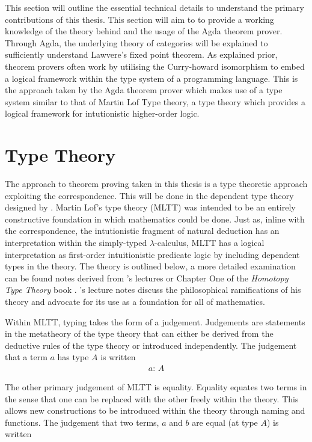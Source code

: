 This section will outline the essential technical details to understand the
primary contributions of this thesis. This section will aim to to provide a
working knowledge of the theory behind and the usage of the Agda theorem prover.
Through Agda, the underlying theory of categories will be explained to
sufficiently understand Lawvere's fixed point theorem. As explained prior,
theorem provers often work by utilising the Curry-howard isomorphism to embed a
logical framework within the type system of a programming language. This is the
approach taken by the Agda theorem prover which makes use of a type system
similar to that of Martin Lof Type theory, a type theory which provides a
logical framework for intutionistic higher-order logic.

\section{\mlt{} Type Theory}
The approach to theorem proving taken in this thesis is a type theoretic
approach exploiting the \cuho{} correspondence. This will be done in the
dependent type theory designed by \mlt{}. Martin Lof's type theory (MLTT) was intended to be an
entirely constructive foundation in which mathematics could be done. Just as,
inline with the \cuho{} correspondence, the intutionistic fragment of
natural deduction has an interpretation within the simply-typed
$\lambda$-calculus, MLTT has a logical interpretation as first-order
intuitionistic predicate logic by including dependent types in the theory. The
theory is outlined below, a more detailed examination can be found notes derived
from \mlt's lectures \cite{martin1984intuitionistic} or Chapter One of the
\textit{Homotopy Type Theory} book \cite{hottbook}. \mlt's lecture notes
discuss the philosophical ramifications of his theory and advocate for its use
as a foundation for all of mathematics.

Within MLTT, typing takes the form of a judgement. Judgements are statements in
the metatheory of the type theory that can either be derived from the deductive
rules of the type theory or introduced independently. The judgement that a term
$a$ has type $A$ is written
\begin{align*}
    a: \, A
\end{align*}

The other primary judgement of MLTT is equality. Equality equates
two terms in the sense that one can be replaced with the other freely within the
theory. This allows new constructions to be introduced within the theory through
naming and functions. The judgement that
two terms, $a$ and $b$ are equal (at type $A$) is written

